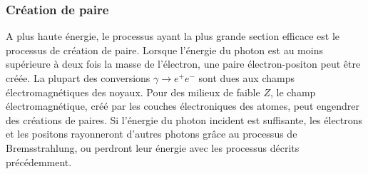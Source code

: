 \subsubsection{Création de paire}
A plus haute énergie, le processus ayant la plus grande section efficace est le processus de création de paire. Lorsque l'énergie du photon est au moins supérieure à deux fois la masse de l'électron, une paire électron-positon peut être créée. La plupart des conversions $\gamma\rightarrow e^+e^-$ sont dues aux champs électromagnétiques des noyaux. Pour des milieux de faible $Z$, le champ électromagnétique, créé par les couches électroniques des atomes, peut engendrer des créations de paires. Si l'énergie du photon incident est suffisante, les électrons et les positons rayonneront d'autres photons grâce au processus de Bremsstrahlung, ou perdront leur énergie avec les processus décrits précédemment.

